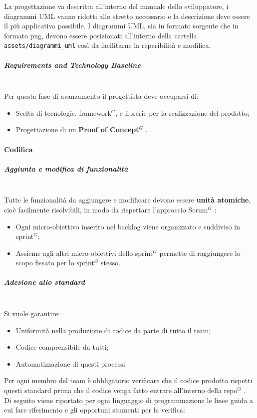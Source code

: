\noindent
La progettazione va descritta all'interno del manuale dello sviluppatore, i
diagrammi UML vanno ridotti allo stretto necessario e la descrizione deve essere
il più applicativa possibile. I diagrammi UML, sia in formato sorgente che in
formato png, devono essere posizionati all'interno della cartella
\texttt{assets/diagrammi\_uml} così da facilitarne la reperibilità e modifica.

\subparagraph{Requirements and Technology Baseline}
\mbox{} \\
Per questa fase di avanzamento il progettista deve occuparsi di:
\begin{itemize}
    \item Scelta di tecnologie, framework$^G$, e librerie per la realizzazione del prodotto;
    \item Progettazione di un \textbf{Proof of Concept}$^G$ .
\end{itemize}

\paragraph{Codifica}

\subparagraph{Aggiunta e modifica di funzionalità}
\mbox{}\\
Tutte le funzionalità da aggiungere e modificare devono essere \textbf{unità atomiche}, cioè facilmente risolvibili, in modo da rispettare
l'approccio Scrum$^G$ :
\begin{itemize}
    \item Ogni micro-obiettivo inserito nel backlog viene organizzato e suddiviso in sprint$^G$;
    \item Assieme agli altri micro-obiettivi dello sprint$^G$ permette di raggiungere lo scopo fissato per lo sprint$^G$ stesso.
\end{itemize}

\subparagraph{Adesione allo standard}
\mbox{}\\
Si vuole garantire:
\begin{itemize}
    \item Uniformità nella produzione di codice da parte di tutto il team;
    \item Codice comprensibile da tutti;
    \item Automatizzazione di questi processi
\end{itemize}
Per ogni membro del team è obbligatorio verificare che il codice prodotto rispetti questi standard prima che il codice
venga fatto entrare all'interno della repo$^G$ .\\
Di seguito viene riportato per ogni linguaggio di programmazione le linee guida a cui fare riferimento e gli opportuni
stumenti per la verifica:

